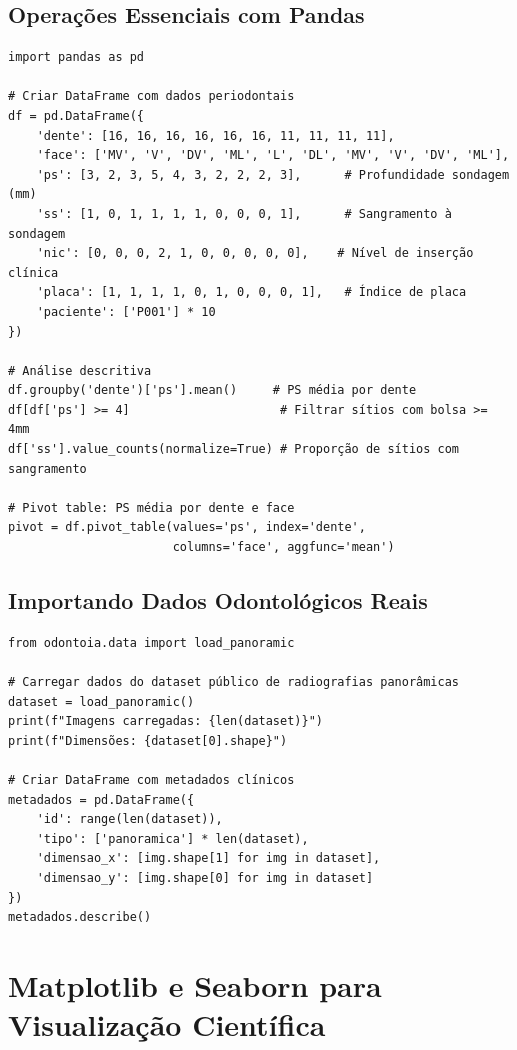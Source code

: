 \subsection{Operações Essenciais com Pandas}

\begin{verbatim}
import pandas as pd

# Criar DataFrame com dados periodontais
df = pd.DataFrame({
    'dente': [16, 16, 16, 16, 16, 16, 11, 11, 11, 11],
    'face': ['MV', 'V', 'DV', 'ML', 'L', 'DL', 'MV', 'V', 'DV', 'ML'],
    'ps': [3, 2, 3, 5, 4, 3, 2, 2, 2, 3],      # Profundidade sondagem (mm)
    'ss': [1, 0, 1, 1, 1, 1, 0, 0, 0, 1],      # Sangramento à sondagem
    'nic': [0, 0, 0, 2, 1, 0, 0, 0, 0, 0],    # Nível de inserção clínica
    'placa': [1, 1, 1, 1, 0, 1, 0, 0, 0, 1],   # Índice de placa
    'paciente': ['P001'] * 10
})

# Análise descritiva
df.groupby('dente')['ps'].mean()     # PS média por dente
df[df['ps'] >= 4]                     # Filtrar sítios com bolsa >= 4mm
df['ss'].value_counts(normalize=True) # Proporção de sítios com sangramento

# Pivot table: PS média por dente e face
pivot = df.pivot_table(values='ps', index='dente',
                       columns='face', aggfunc='mean')
\end{verbatim}

\subsection{Importando Dados Odontológicos Reais}

\begin{verbatim}
from odontoia.data import load_panoramic

# Carregar dados do dataset público de radiografias panorâmicas
dataset = load_panoramic()
print(f"Imagens carregadas: {len(dataset)}")
print(f"Dimensões: {dataset[0].shape}")

# Criar DataFrame com metadados clínicos
metadados = pd.DataFrame({
    'id': range(len(dataset)),
    'tipo': ['panoramica'] * len(dataset),
    'dimensao_x': [img.shape[1] for img in dataset],
    'dimensao_y': [img.shape[0] for img in dataset]
})
metadados.describe()
\end{verbatim}

\section{Matplotlib e Seaborn para Visualização Científica}

